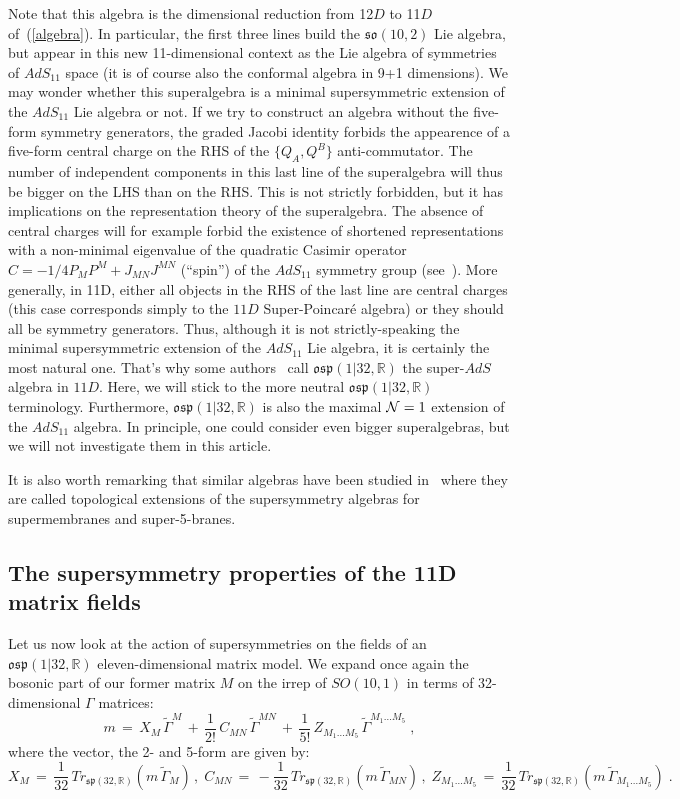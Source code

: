 \documentclass[a4paper,11pt]{article}
\begin{document}
Note that this algebra is the dimensional reduction from 12$D$ to 11$D$ of~(\ref{algebra}).
In particular, the first three lines build the $\mathfrak{so}(10,2)$ Lie algebra, but appear
in this new 11-dimensional context as the Lie algebra of symmetries of $AdS_{11}$ space 
(it is of course also the conformal algebra in 9+1 dimensions). We may wonder whether this 
superalgebra is a minimal supersymmetric extension of the $AdS_{11}$ Lie algebra or not. 
If we try to construct an algebra without the five-form symmetry generators,
the graded Jacobi identity forbids the appearence of a five-form central charge on the RHS of 
the $\{Q_A,Q^B\}$ anti-commutator. The number of independent components in this last line of the 
superalgebra will thus be bigger on the LHS than on the RHS. This is not strictly forbidden, but 
it has implications on the representation theory of the superalgebra. The absence of central 
charges will for example forbid the existence of shortened representations with a non-minimal
eigenvalue of the quadratic Casimir operator $C=-1/4 P_M P^M + J_{MN} J^{MN}$ (``spin'') of the 
$AdS_{11}$ symmetry group (see~\cite{Nic}). 
More generally, in 11D, either all objects in the RHS of the last line are central charges 
(this case corresponds simply to the $11D$ Super-Poincar\'e algebra) or they should all be 
symmetry generators.
Thus, although it is not strictly-speaking the minimal supersymmetric extension of the 
$AdS_{11}$ Lie algebra, it is certainly the most natural one. That's why some authors~\cite{BVP} 
call $\mathfrak{osp}(1|32,\mathbb{R})$ the super-$AdS$ algebra in $11D$. Here, we will 
stick to the more neutral $\mathfrak{osp}(1|32,\mathbb{R})$ terminology. 
Furthermore, $\mathfrak{osp}(1|32,\mathbb{R})$ is also the maximal ${\cal N}=1$ extension of the $AdS_{11}$
algebra. In principle, one could consider even bigger superalgebras, but we will not investigate
them in this article.

It is also worth remarking that similar algebras have been studied in~\cite{Sez} where they are called
topological extensions of the supersymmetry algebras for supermembranes and super-5-branes. 

\subsection{The supersymmetry properties of the 11D matrix fields}
Let us now look at the action of supersymmetries on the fields of an 
$\mathfrak{osp}(1|32,\mathbb{R})$ eleven-dimensional matrix model.
We expand once again the bosonic part of our former matrix
$M$ on the irrep of $SO(10,1)$ in terms of 32-dimensional $\Gamma$ matrices:
$$
m\,=\,
X_M\,\widetilde{\Gamma}^M\,+\,\frac{1}{2!}\,C_{MN}\,\widetilde{\Gamma}^{MN}
\,+\,\frac{1}{5!}\,Z_{M_1\ldots M_5}\,\widetilde{\Gamma}^{M_1\ldots M_5}\;,
$$ 
where the vector, the 2- and 5-form are given by:
$$
X_M\,=\, \frac{1}{32}\,Tr_{\mathfrak{sp}(32,\mathbb{R})}(m\,\widetilde{\Gamma}_{M})\,, \;
C_{MN}\,=\, -\frac{1}{32}\,Tr_{\mathfrak{sp}(32,\mathbb{R})}(m\,\widetilde{\Gamma}_{MN})\,, \;
Z_{M_1\ldots M_5}\,=\, \frac{1}{32}\,Tr_{\mathfrak{sp}(32,\mathbb{R})}
(m\,\widetilde{\Gamma}_{M_1\ldots M_5})\;.
$$
\end{document}

